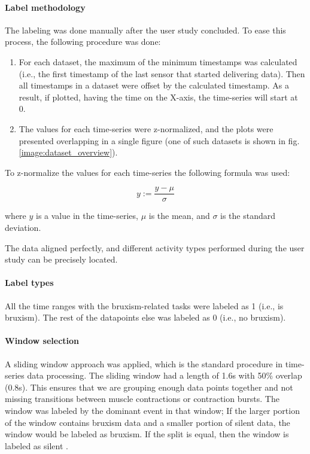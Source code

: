 \paragraph{Label methodology}

The labeling was done manually after the user study concluded. To ease this process, the following procedure was done:

\begin{enumerate}
    \item For each dataset, the maximum of the minimum timestamps was calculated (i.e., the first timestamp of the last sensor that started delivering data). Then all timestamps in a dataset were offset by the calculated timestamp. As a result, if plotted, having the time on the X-axis, the time-series will start at 0.
    \item The values for each time-series were z-normalized, and the plots were presented overlapping in a single figure (one of such datasets is shown in fig. \ref{image:dataset_overview}).
\end{enumerate}

To z-normalize the values for each time-series the following formula was used:

\[ y := \frac{y - \mu}{\sigma} \]

where $y$ is a value in the time-series, $\mu$ is the mean, and $\sigma$ is the standard deviation. 

The data aligned perfectly, and different activity types performed during the user study can be precisely located.

\paragraph{Label types}

All the time ranges with the bruxism-related tasks were labeled as 1 (i.e., is bruxism). The rest of the datapoints else was labeled as 0 (i.e., no bruxism).

\paragraph{Window selection}

A sliding window approach was applied, which is the standard procedure in time-series data processing. The sliding window had a length of 1.6s with 50\% overlap (0.8s). This ensures that we are grouping enough data points together and not missing transitions between muscle contractions or contraction bursts. The window was labeled by the dominant event in that window; If the larger portion of the window contains bruxism data and a smaller portion of silent data, the window would be labeled as bruxism. If the split is equal, then the window is labeled as silent \cite{bondareva2021earables}.

